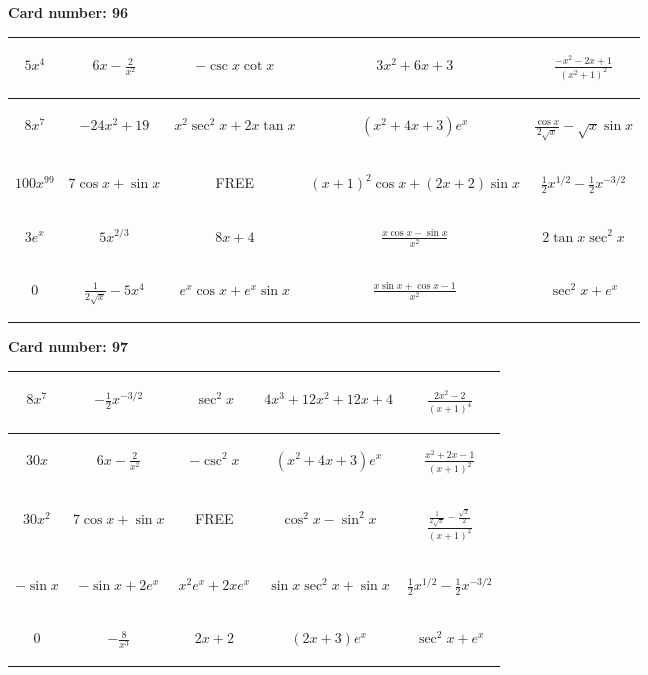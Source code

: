 \documentclass{article}
\newcommand{\entry}[1]{\begin{minipage}[t][2.75cm][t]{4cm} \vspace{1cm} \begin{center}#1\end{center} \end{minipage}}
\newcommand{\freespace}{\entry{FREE}}
\newcommand{\cardnumber}[1]{\noindent \textbf{Card number: #1} \bigskip}
\begin{document}
\pagebreak

\cardnumber{96}
\begin{center}
\begin{tabular}{|*{5}{c|}}
    \hline
    \entry{$5x^4$} & \entry{$6x - \frac{2}{x^2}$} & \entry{$-\csc x \cot x$} & \entry{$3x^2 + 6x + 3$} & \entry{$\frac{-x^2 - 2x + 1}{(x^2 + 1)^2}$} \\ \hline
    \entry{$8x^7$} & \entry{$-24x^2 + 19$} & \entry{$x^2 \sec^2 x + 2x \tan x$} & \entry{$(x^2 + 4x + 3) e^x$} & \entry{$\frac{\cos x}{2 \sqrt{x}} - \sqrt{x} \sin x$} \\ \hline
    \entry{$100x^{99}$} & \entry{$7 \cos x + \sin x$} & \freespace & \entry{$(x + 1)^2 \cos x + (2x + 2) \sin x$} & \entry{$\frac{1}{2} x^{1/2} - \frac{1}{2} x^{-3/2}$} \\ \hline
    \entry{$3e^x$} & \entry{$5x^{2/3}$} & \entry{$8x + 4$} & \entry{$\frac{x \cos x - \sin x}{x^2}$} & \entry{$2 \tan x \sec^2 x$} \\ \hline
    \entry{$0$} & \entry{$\frac{1}{2\sqrt{x}} - 5x^4$} & \entry{$e^x \cos x + e^x \sin x$} & \entry{$\frac{x \sin x + \cos x - 1}{x^2}$} & \entry{$\sec^2 x + e^x$} \\ \hline
\end{tabular}
\end{center}

\pagebreak

\cardnumber{97}
\begin{center}
\begin{tabular}{|*{5}{c|}}
    \hline
    \entry{$8x^7$} & \entry{$-\frac{1}{2} x^{-3/2}$} & \entry{$\sec^2 x$} & \entry{$4x^3 + 12x^2 + 12x + 4$} & \entry{$\frac{2x^2 - 2}{(x + 1)^4}$} \\ \hline
    \entry{$30x$} & \entry{$6x - \frac{2}{x^2}$} & \entry{$-\csc^2 x$} & \entry{$(x^2 + 4x + 3) e^x$} & \entry{$\frac{x^2 + 2x - 1}{(x + 1)^2}$} \\ \hline
    \entry{$30x^2$} & \entry{$7 \cos x + \sin x$} & \freespace & \entry{$\cos^2 x - \sin^2 x$} & \entry{$\frac{\frac{1}{2 \sqrt{x}} - \frac{\sqrt{x}}{2}}{(x + 1)^2}$} \\ \hline
    \entry{$-\sin x$} & \entry{$-\sin x + 2e^x$} & \entry{$x^2 e^x + 2x e^x$} & \entry{$\sin x \sec^2 x + \sin x$} & \entry{$\frac{1}{2} x^{1/2} - \frac{1}{2} x^{-3/2}$} \\ \hline
    \entry{$0$} & \entry{$-\frac{8}{x^3}$} & \entry{$2x + 2$} & \entry{$(2x + 3) e^x$} & \entry{$\sec^2 x + e^x$} \\ \hline
\end{tabular}
\end{center}
\end{document}
